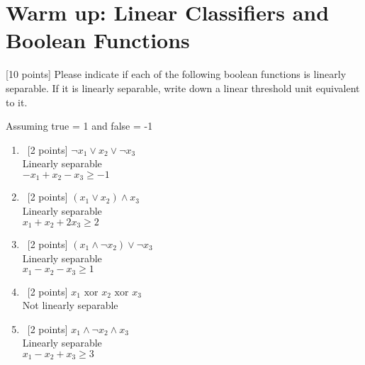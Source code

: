 \section{Warm up: Linear Classifiers and Boolean Functions}\label{sec:q1}

[10 points] Please indicate if each of the following boolean functions is linearly separable.
If it is linearly separable, write down a linear threshold unit equivalent to it.

Assuming true = 1 and false = -1
\begin{enumerate}
\item~[2 points] $\neg x_1\vee x_2\vee\neg x_3$\\
Linearly separable \\$- x_1 + x_2 - x_3 \ge -1$

\item~[2 points] $(x_1\vee x_2)\wedge x_3$\\
Linearly separable \\$x_1 + x_2 + 2x_3 \ge 2$

\item~[2 points] $(x_1\wedge\neg x_2)\vee \neg x_3$\\
Linearly separable \\
$x_1 - x_2 - x_3 \ge 1$
\item~[2 points] $x_1\text{ xor } x_2\text{ xor }x_3$\\
Not linearly separable
\item~[2 points] $x_1 \wedge \neg x_2\wedge x_3$\\
Linearly separable \\
$x_1 - x_2 + x_3 \ge 3$
\end{enumerate}




